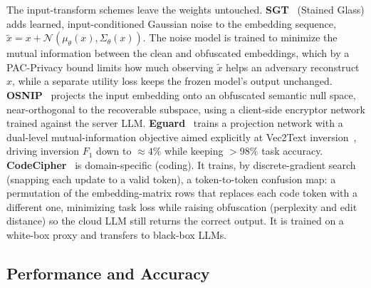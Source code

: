 The input-transform schemes leave the weights untouched. \textbf{SGT}~\citep{roberts_sgt}
(Stained Glass) adds learned, input-conditioned Gaussian noise to the embedding sequence,
$\tilde{x}{=}x{+}\mathcal{N}(\mu_\theta(x),\Sigma_\theta(x))$. The noise model is trained to
minimize the mutual information between the clean and obfuscated embeddings, which by a
PAC-Privacy bound limits how much observing $\tilde{x}$ helps an adversary reconstruct $x$,
while a separate utility loss keeps the frozen model's output unchanged.
\textbf{OSNIP}~\citep{cao_osnip} projects the input embedding onto an obfuscated semantic null
space, near-orthogonal to the recoverable subspace, using a client-side encryptor network
trained against the server LLM. \textbf{Eguard}~\citep{eguard} trains a projection network
with a dual-level mutual-information objective aimed explicitly at Vec2Text
inversion~\citep{vec2text}, driving inversion $F_1$ down to ${\approx}4\%$ while keeping
${>}98\%$ task accuracy. \textbf{CodeCipher}~\citep{codecipher} is domain-specific (coding). It trains, by discrete-gradient search (snapping each update to a valid token), a token-to-token confusion
map: a permutation of the embedding-matrix rows that replaces each code token with a different
one, minimizing task loss while raising obfuscation (perplexity and edit distance) so the
cloud LLM still returns the correct output. It is trained on a white-box proxy and transfers
to black-box LLMs.

\subsection{Performance and Accuracy}
\label{sec:obfusc-perf}

